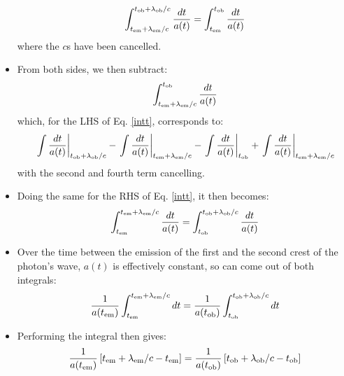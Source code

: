 \documentclass[11pt]{article}
\begin{document}
\begin{itemize}
\begin{equation}
    \label{intt}
    \int_{t_{\rm em}+\lambda_{\rm em}/c}^{t_{\rm ob}+\lambda_{\rm ob}/c}\frac{dt}{a(t)}=\int_{t_{\rm em}}^{t_{\rm ob}}\frac{dt}{a(t)}
\end{equation}
where the $c$s have been cancelled. 
\item From both sides, we then subtract:
\begin{equation}
    \int_{t_{\rm em}+\lambda_{\rm em}/c}^{t_{\rm ob}}\frac{dt}{a(t)}
\end{equation}
which, for the LHS of Eq. \ref{intt}, corresponds to:
\begin{equation}
    \left.\int\frac{dt}{a(t)} \right|_{t_{\rm ob}+\lambda_{\rm ob}/c} - \left.\int\frac{dt}{a(t)} \right|_{t_{\rm em}+\lambda_{\rm em}/c} - 
    \left.\int\frac{dt}{a(t)} \right|_{t_{\rm ob}} +
    \left.\int\frac{dt}{a(t)} \right|_{t_{\rm em}+\lambda_{\rm em}/c}
\end{equation}
with the second and fourth term cancelling.
\item Doing the same for the RHS of Eq. \ref{intt}, it then becomes:
\begin{equation}
    \int^{t_{\rm em}+\lambda_{\rm em}/c}_{t_{\rm em}}\frac{dt}{a(t)}=
    \int_{t_{\rm ob}}^{t_{\rm ob}+\lambda_{\rm ob}/c}\frac{dt}{a(t)}
\end{equation}    

\item Over the time between the emission of the first and the second crest of the photon's wave, $a(t)$ is effectively constant, so can come out of both integrals:
\begin{equation}
    \frac{1}{a(t_{\rm em})}\int^{t_{\rm em}+\lambda_{\rm em}/c}_{t_{\rm em}}dt=\frac{1}{a(t_{\rm ob})}\int_{t_{\rm ob}}^{t_{\rm ob}+\lambda_{\rm ob}/c}dt
\end{equation}

\item Performing the integral then gives:
\begin{equation}
    \frac{1}{a(t_{\rm em})}\left[t_{\rm em}+\lambda_{\rm em}/c - t_{\rm em}\right]=\frac{1}{a(t_{\rm ob})}\left[t_{\rm ob}+\lambda_{\rm ob}/c - t_{\rm ob}\right]
\end{equation}



\end{itemize}
\end{document}
